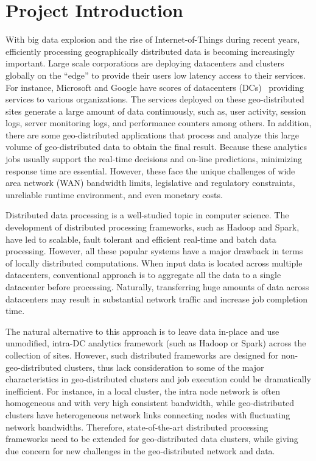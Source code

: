 \documentclass[base.tex]{subfiles}
\begin{document}
\section{Project Introduction}
With big data explosion and the rise of Internet-of-Things during recent years, efficiently processing geographically distributed data is becoming increasingly important. Large scale corporations are deploying datacenters and clusters globally on the ``edge'' to provide their users low latency access to their services. \iffalse Often these corporations employ the services of well established and geographically distributed commercial cloud providers to implement geo-distributed data analytics services. \fi For instance, Microsoft and Google have scores of datacenters (DCs)~\cite{googledata2018,microsoftdata2018} providing services to various organizations. The services deployed on these geo-distributed sites generate a large amount of data continuously, such as, user activity, session logs, server monitoring logs, and performance counters among others. In addition, there are some geo-distributed applications that  process and analyze this large volume of geo-distributed data to obtain the final result. Because these analytics jobs usually support the real-time decisions and on-line predictions, minimizing response time are essential. However, these face the unique challenges of wide area network (WAN) bandwidth limits, legislative and regulatory constraints, unreliable runtime environment, and even monetary costs.

Distributed data processing is a well-studied topic in computer science. The development of distributed processing frameworks, such as Hadoop and Spark, have led to scalable, fault tolerant and efficient real-time and batch data processing. However, all these popular systems have a major drawback in terms of locally distributed computations. When input data is located across multiple datacenters, conventional approach is to aggregate all the data to a single datacenter before processing. Naturally, transferring huge amounts of data across datacenters may result in substantial network traffic and increase job completion time.

The natural alternative to this approach is to leave data in-place and use unmodified, intra-DC analytics framework (such as Hadoop or Spark) across the collection of sites. However, such distributed frameworks are designed for non-geo-distributed clusters, thus lack consideration to some of the major characteristics in geo-distributed clusters and job execution could be dramatically inefficient. For instance, in a local cluster, the intra node network is often homogeneous and with very high consistent bandwidth, while geo-distributed clusters have heterogeneous network links connecting nodes with fluctuating network bandwidths. Therefore, state-of-the-art distributed processing frameworks need to be extended for geo-distributed data clusters, while giving due concern for new challenges in the geo-distributed network and data.
   
\end{document}
